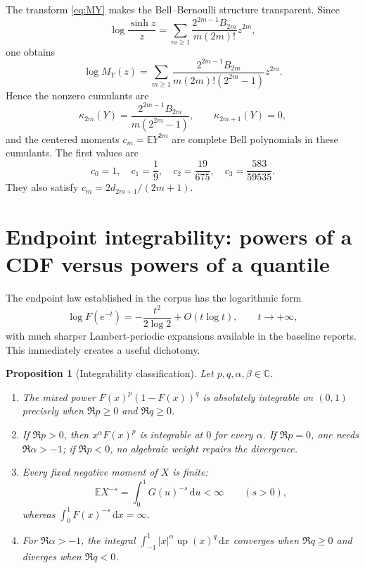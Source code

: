 \documentclass[11pt,oneside]{article}
\newtheorem{proposition}[theorem]{Proposition}
\theoremstyle{definition}
\theoremstyle{remark}
\newcommand{\F}{F}
\newcommand{\G}{G}
\newcommand{\Up}{\operatorname{up}}
\newcommand{\E}{\mathbb E}
\newcommand{\C}{\mathbb C}
\newcommand{\dd}{\,\mathrm d}
\begin{document}
The transform \eqref{eq:MY} makes the Bell--Bernoulli structure transparent.
Since
\[
 \log\frac{\sinh z}{z}
 =\sum_{m\ge1}\frac{2^{2m-1}B_{2m}}{m(2m)!}z^{2m},
\]
one obtains
\begin{equation}\label{eq:cumulants}
 \log M_Y(z)
 =\sum_{m\ge1}
 \frac{2^{2m-1}B_{2m}}{m(2m)!(2^{2m}-1)}z^{2m}.
\end{equation}
Hence the nonzero cumulants are
\begin{equation}
 \kappa_{2m}(Y)=
 \frac{2^{2m-1}B_{2m}}{m(2^{2m}-1)},
 \qquad \kappa_{2m+1}(Y)=0,
\end{equation}
and the centered moments
\(c_m=\E Y^{2m}\) are complete Bell polynomials in these cumulants.  The first
values are
\[
 c_0=1,\quad c_1=\frac19,\quad c_2=\frac{19}{675},\quad
 c_3=\frac{583}{59535}.
\]
They also satisfy \(c_m=2d_{2m+1}/(2m+1)\).

\section{Endpoint integrability: powers of a CDF versus powers of a quantile}

The endpoint law established in the corpus has the logarithmic form
\begin{equation}\label{eq:endpointlog}
 \log\F(e^{-t})=-\frac{t^2}{2\log2}+O(t\log t),
 \qquad t\to+\infty,
\end{equation}
with much sharper Lambert-periodic expansions available in the baseline
reports.  This immediately creates a useful dichotomy.

\begin{proposition}[Integrability classification]\label{prop:integrability}
Let \(p,q,\alpha,\beta\in\C\).
\begin{enumerate}[label=(\roman*)]
 \item The mixed power
 \(\F(x)^p(1-\F(x))^q\) is absolutely integrable on \((0,1)\) precisely when
 \(\Re p\ge0\) and \(\Re q\ge0\).
 \item If \(\Re p>0\), then \(x^\alpha\F(x)^p\) is integrable at \(0\) for
 every \(\alpha\).  If \(\Re p=0\), one needs \(\Re\alpha>-1\); if
 \(\Re p<0\), no algebraic weight repairs the divergence.
 \item Every fixed negative moment of \(X\) is finite:
 \[
   \E X^{-s}=\int_0^1\G(u)^{-s}\dd u<\infty\qquad(s>0),
 \]
 whereas \(\int_0^1\F(x)^{-s}\dd x=\infty\).
 \item For \(\Re\alpha>-1\), the integral
 \(\int_{-1}^1|x|^\alpha\Up(x)^q\dd x\) converges when \(\Re q\ge0\) and
 diverges when \(\Re q<0\).
\end{enumerate}
\end{proposition}
\end{document}
